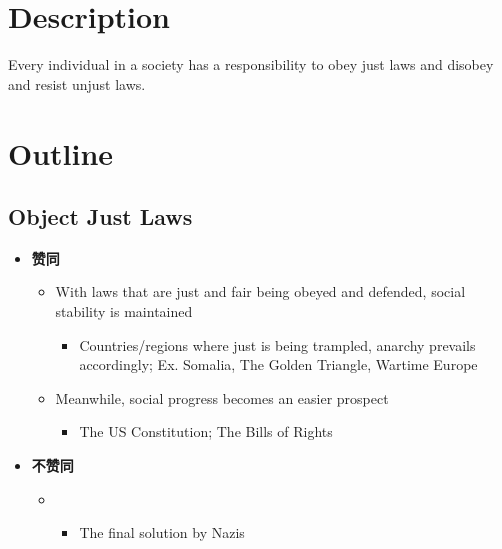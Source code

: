 \documentclass{article}
\begin{document}
  \section{Description}

    Every individual in a society has a responsibility to obey just laws
    and disobey and resist unjust laws.

  \section{Outline}

    \subsection{Object Just Laws}

      \begin{itemize}
        \item \textbf{赞同}
        \begin{itemize}
          \item With laws that are just and fair being obeyed and defended,
          social stability is maintained
          \begin{itemize}
            \item Countries/regions where just is being trampled, anarchy
            prevails accordingly; Ex. Somalia, The Golden Triangle,
            Wartime Europe
          \end{itemize}

          \item Meanwhile, social progress becomes an easier prospect
          \begin{itemize}
            \item The US Constitution; The Bills of Rights
          \end{itemize}
        \end{itemize}

        \item \textbf{不赞同}
        \begin{itemize}
          \item {}
          \begin{itemize}
            \item The final solution by Nazis
          \end{itemize}
        \end{itemize}
      \end{itemize}
\end{document}
